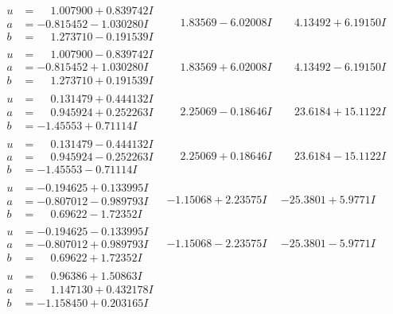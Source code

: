 \documentclass[1p]{elsarticle_modified}
\theoremstyle{definition}
\begin{document}
$$\begin{array}{c|c|c}
\begin{aligned}
u &= \phantom{-}1.007900 + 0.839742 I \\
a &= -0.815452 - 1.030280 I \\
b &= \phantom{-}1.273710 - 0.191539 I\end{aligned}
 & \phantom{-}1.83569 - 6.02008 I & \phantom{-}4.13492 + 6.19150 I \\ \hline\begin{aligned}
u &= \phantom{-}1.007900 - 0.839742 I \\
a &= -0.815452 + 1.030280 I \\
b &= \phantom{-}1.273710 + 0.191539 I\end{aligned}
 & \phantom{-}1.83569 + 6.02008 I & \phantom{-}4.13492 - 6.19150 I \\ \hline\begin{aligned}
u &= \phantom{-}0.131479 + 0.444132 I \\
a &= \phantom{-}0.945924 + 0.252263 I \\
b &= -1.45553 + 0.71114 I\end{aligned}
 & \phantom{-}2.25069 - 0.18646 I & \phantom{-}23.6184 + 15.1122 I \\ \hline\begin{aligned}
u &= \phantom{-}0.131479 - 0.444132 I \\
a &= \phantom{-}0.945924 - 0.252263 I \\
b &= -1.45553 - 0.71114 I\end{aligned}
 & \phantom{-}2.25069 + 0.18646 I & \phantom{-}23.6184 - 15.1122 I \\ \hline\begin{aligned}
u &= -0.194625 + 0.133995 I \\
a &= -0.807012 - 0.989793 I \\
b &= \phantom{-}0.69622 - 1.72352 I\end{aligned}
 & -1.15068 + 2.23575 I & -25.3801 + 5.9771 I \\ \hline\begin{aligned}
u &= -0.194625 - 0.133995 I \\
a &= -0.807012 + 0.989793 I \\
b &= \phantom{-}0.69622 + 1.72352 I\end{aligned}
 & -1.15068 - 2.23575 I & -25.3801 - 5.9771 I \\ \hline\begin{aligned}
u &= \phantom{-}0.96386 + 1.50863 I \\
a &= \phantom{-}1.147130 + 0.432178 I \\
b &= -1.158450 + 0.203165 I\end{aligned}

\end{array}$$
\end{document}
